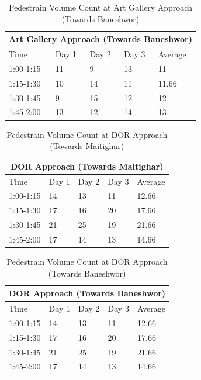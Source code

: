 \begin{table}[h!]
    \centering
    \caption{Pedestrain Volume Count at Art Gallery Approach (Towards Baneshwor) }
    \begin{tabular}{|l|l|l|l|l|}
        \hline
        \multicolumn{5}{|c|}{ \textbf{Art Gallery Approach (Towards Baneshwor) } } \\
        \hline
        Time	&Day 1	&Day 2	&Day 3	&Average \\ \hline
        1:00-1:15	&11	&9	&13	&11 \\ \hline
        1:15-1:30	&10	&14	&11	&11.66 \\ \hline
        1:30-1:45	&9	&15	&12	&12 \\ \hline
        1:45-2:00	&13	&12	&14	&13 \\ \hline
    \end{tabular}
\end{table}

\begin{table}[h!]
    \centering
    \caption{ Pedestrain Volume Count at DOR Approach (Towards Maitighar) } 
    \begin{tabular}{|l|l|l|l|l|}
        \hline
        \multicolumn{5}{|c|}{ \textbf{DOR Approach (Towards Maitighar) } } \\
        \hline
        Time	&Day 1	&Day 2	&Day 3	&Average \\ \hline
        1:00-1:15	&14	&13	&11	&12.66 \\ \hline
        1:15-1:30	&17	&16	&20	&17.66 \\ \hline
        1:30-1:45	&21	&25	&19	&21.66 \\ \hline
        1:45-2:00	&17	&14	&13	&14.66 \\ \hline
    \end{tabular}
\end{table}

\begin{table}[h!]
    \centering
    \caption{Pedestrain Volume Count at DOR Approach (Towards Baneshwor) }
    \begin{tabular}{|l|l|l|l|l|}
        \hline
        \multicolumn{5}{|c|}{ \textbf{DOR Approach (Towards Baneshwor) } } \\
        \hline
        Time	&Day 1	&Day 2	&Day 3	&Average \\ \hline
        1:00-1:15	&14	&13	&11	&12.66 \\ \hline
        1:15-1:30	&17	&16	&20	&17.66 \\ \hline
        1:30-1:45	&21	&25	&19	&21.66 \\ \hline
        1:45-2:00	&17	&14	&13	&14.66 \\ \hline

    \end{tabular}
\end{table}
